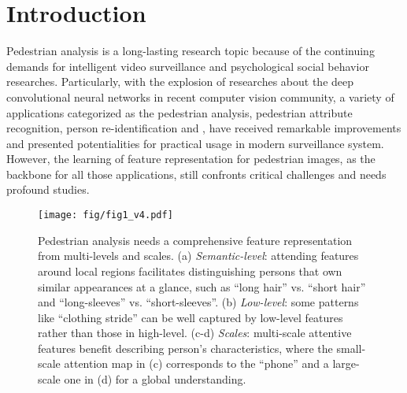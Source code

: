\documentclass[10pt,twocolumn,letterpaper]{article}
\begin{document}
\section{Introduction}
\label{sec:intro}
Pedestrian analysis is a long-lasting research topic because of the continuing demands for intelligent video surveillance and psychological social behavior researches.
%
Particularly, with the explosion of researches about the deep convolutional neural networks in recent computer vision community, a variety of applications categorized as the pedestrian analysis, \eg pedestrian attribute recognition, person re-identification and \etc, have received remarkable improvements and presented potentialities for practical usage in modern surveillance system.
%
However, the learning of feature representation for pedestrian images, as the backbone for all those applications, still confronts critical challenges and needs profound studies.



\begin{figure}[t]
\centering
\texttt{[image: fig/fig1\_v4.pdf]}
\caption{
Pedestrian analysis needs a comprehensive feature representation from multi-levels and scales.
(a) \textit{Semantic-level}: attending features around local regions facilitates distinguishing persons that own similar appearances at a glance, such as ``long hair'' vs. ``short hair'' and ``long-sleeves'' vs. ``short-sleeves''.
%
(b) \textit{Low-level}: some patterns like ``clothing stride'' can be well captured by low-level features rather than those in high-level.
%
(c-d) \textit{Scales}: multi-scale attentive features benefit describing person's characteristics, where the small-scale attention map in (c) corresponds to the ``phone'' and a large-scale one in (d) for a global understanding.
%
}
\label{fig:fig1}
\vspace{-5pt}
\end{figure}
\end{document}
